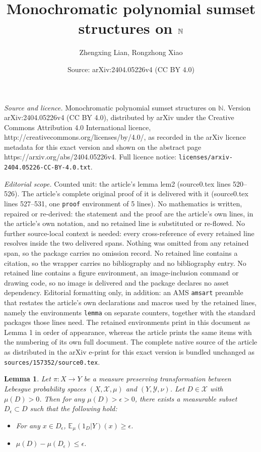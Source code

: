 \documentclass[10pt,a4paper]{amsart}
\title{Monochromatic polynomial sumset structures on $\N$}
\author{Zhengxing Lian, Rongzhong Xiao}
\date{Source: arXiv:2404.05226v4 (CC BY 4.0)}
\def \N {\mathbb N}
\newtheorem{lemma}{Lemma}
\def \E {\mathbb E}
\def \X {\mathcal{X}}
\def \Y {\mathcal{Y}}
\def \ep {\epsilon}
\begin{document}
\maketitle

\noindent\emph{Source and licence.} Monochromatic polynomial sumset structures on $\N$. Version arXiv:2404.05226v4 (CC BY 4.0), distributed by arXiv under the Creative Commons Attribution 4.0 International licence, http://creativecommons.org/licenses/by/4.0/, as recorded in the arXiv licence metadata for this exact version and shown on the abstract page https://arxiv.org/abs/2404.05226v4. Full licence notice: \texttt{licenses/arxiv-2404.05226-CC-BY-4.0.txt}.\par\smallskip

\noindent\textit{Editorial scope.} Counted unit: the article's lemma lem2 (source0.tex lines 520--526). The article's complete original proof of it is delivered with it (source0.tex lines 527--531, one \texttt{proof} environment of 5 lines). No mathematics is written, repaired or re-derived: the statement and the proof are the article's own lines, in the article's own notation, and no retained line is substituted or re-flowed.  No further source-local context is needed: every cross-reference of every retained line resolves inside the two delivered spans.  Nothing was omitted from any retained span, so the package carries no omission record.  No retained line contains a citation, so the wrapper carries no bibliography and no bibliography entry.  No retained line contains a figure environment, an image-inclusion command or drawing code, so no image is delivered and the package declares no asset dependency.  Editorial formatting only, in addition: an AMS \texttt{amsart} preamble that restates the article's own declarations and macros used by the retained lines, namely the environments \texttt{lemma} on separate counters, together with the standard packages those lines need.  The retained environments print in this document as Lemma 1 in order of appearance, whereas the article prints the same items with the numbering of its own full document.  The complete native source of the article as distributed in the arXiv e-print for this exact version is bundled unchanged as \texttt{sources/157352/source0.tex}.
\begin{lemma}\label{lem2}
	Let $\pi:X\to Y$ be a measure preserving transformation between Lebesgue probability spaces $(X,\X,\mu)$ and $(Y,\Y,\nu)$. Let $D\in \X$ with $\mu(D)>0$. Then for any $\mu(D)>\epsilon>0$, there exists a measurable subset $D_{\ep}\subset D$ such that the following hold:
	\begin{itemize}
		\item For any $x\in D_{\ep}$, $\E_{\mu}(1_{D}|Y)(x)\ge \ep$.
		\item $\mu(D)-\mu(D_{\ep})\le\ep$.
	\end{itemize}
\end{lemma}
\end{document}
